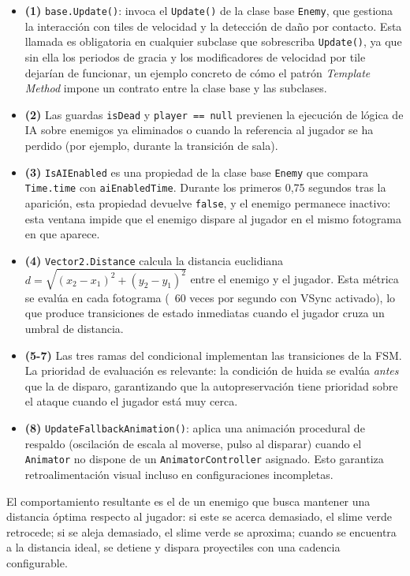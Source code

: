 \begin{itemize}
\item \textbf{(1)} \texttt{base.Update()}: invoca el \texttt{Update()} de la clase base \texttt{Enemy}, que gestiona la interacción con tiles de velocidad y la detección de daño por contacto. Esta llamada es obligatoria en cualquier subclase que sobrescriba \texttt{Update()}, ya que sin ella los periodos de gracia y los modificadores de velocidad por tile dejarían de funcionar, un ejemplo concreto de cómo el patrón \textit{Template Method} impone un contrato entre la clase base y las subclases.
\item \textbf{(2)} Las guardas \texttt{isDead} y \texttt{player == null} previenen la ejecución de lógica de IA sobre enemigos ya eliminados o cuando la referencia al jugador se ha perdido (por ejemplo, durante la transición de sala).
\item \textbf{(3)} \texttt{IsAIEnabled} es una propiedad de la clase base \texttt{Enemy} que compara \texttt{Time.time} con \texttt{aiEnabledTime}. Durante los primeros 0,75 segundos tras la aparición, esta propiedad devuelve \texttt{false}, y el enemigo permanece inactivo: esta ventana impide que el enemigo dispare al jugador en el mismo fotograma en que aparece.
\item \textbf{(4)} \texttt{Vector2.Distance} calcula la distancia euclidiana $d = \sqrt{(x_2 - x_1)^2 + (y_2 - y_1)^2}$ entre el enemigo y el jugador. Esta métrica se evalúa en cada fotograma (~60 veces por segundo con VSync activado), lo que produce transiciones de estado inmediatas cuando el jugador cruza un umbral de distancia.
\item \textbf{(5-7)} Las tres ramas del condicional implementan las transiciones de la FSM. La prioridad de evaluación es relevante: la condición de huida se evalúa \textit{antes} que la de disparo, garantizando que la autopreservación tiene prioridad sobre el ataque cuando el jugador está muy cerca.
\item \textbf{(8)} \texttt{UpdateFallbackAnimation()}: aplica una animación procedural de respaldo (oscilación de escala al moverse, pulso al disparar) cuando el \texttt{Animator} no dispone de un \texttt{AnimatorController} asignado. Esto garantiza retroalimentación visual incluso en configuraciones incompletas.
\end{itemize}

El comportamiento resultante es el de un enemigo que busca mantener una distancia óptima respecto al jugador: si este se acerca demasiado, el slime verde retrocede; si se aleja demasiado, el slime verde se aproxima; cuando se encuentra a la distancia ideal, se detiene y dispara proyectiles con una cadencia configurable.

